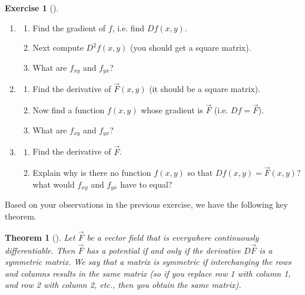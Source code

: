 \documentclass[10pt,]{book}
\theoremstyle{plain}
\newtheorem{theorem}{Theorem}[section]
\theoremstyle{definition}
\theoremstyle{definition}
\theoremstyle{definition}
\theoremstyle{definition}
\newtheorem{exploration}[project]{Exercise}
\theoremstyle{definition}
\numberwithin{equation}{section}
\begin{document}
\begin{exploration}[]\label{exploration-203}
\leavevmode%
\begin{enumerate}[font=\bfseries,label=(\alph*),ref=\alph*]
\item\label{task-513} \begin{enumerate}[font=\bfseries,label=(\roman*),ref=\theenumi.\roman*]
\item\label{task-514} Find the gradient of \(f\), i.e. find \(Df(x,y)\).%
\item\label{task-515} Next compute \(D^2f(x,y)\) (you should get a square matrix).%
\item\label{task-516} What are \(f_{xy}\) and \(f_{yx}\)?%
\end{enumerate}
\item\label{task-517} \begin{enumerate}[font=\bfseries,label=(\roman*),ref=\theenumi.\roman*]
\item\label{task-518} Find the derivative of \(\vec F(x,y)\) (it should be a square matrix).%
\item\label{task-519} Now find a function \(f(x,y)\) whose gradient is \(\vec F\) (i.e. \(Df=\vec F\)).%
\item\label{task-520} What are \(f_{xy}\) and \(f_{yx}\)?%
\end{enumerate}
\item\label{task-521} \begin{enumerate}[font=\bfseries,label=(\roman*),ref=\theenumi.\roman*]
\item\label{task-522} Find the derivative of \(\vec F\).%
\item\label{task-523} Explain why is there no function \(f(x,y)\) so that \(Df(x,y)=\vec F(x,y)\)? what would \(f_{xy}\) and \(f_{yx}\) have to equal?%
%
\end{enumerate}
\end{enumerate}
\end{exploration}
Based on your observations in the previous exercise, we have the following key theorem.%
\begin{theorem}[{}]\label{thm_has_potential}
Let \(\vec F\) be a vector field that is everywhere continuously differentiable. Then \(\vec F\) has a potential if and only if the derivative \(D\vec F\) is a symmetric matrix. We say that a matrix is symmetric if interchanging the rows and columns results in the same matrix (so if you replace row 1 with column 1, and row 2 with column 2, etc., then you obtain the same matrix).%
\end{theorem}
\end{document}
